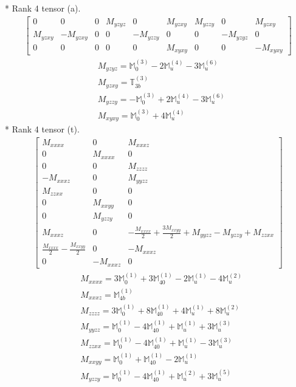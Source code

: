 \documentclass[fleqn,8pt,landscape]{jsarticle}
\begin{document}
* Rank 4 tensor (a).
\begin{align*}
\begin{bmatrix} 0 & 0 & 0 & M_{yzyz} & 0 & M_{yzxy} & M_{yzzy} & 0 & M_{yzxy} \\ M_{yzxy} & - M_{yzxy} & 0 & 0 & - M_{yzzy} & 0 & 0 & - M_{yzyz} & 0 \\ 0 & 0 & 0 & 0 & 0 & M_{xyxy} & 0 & 0 & - M_{xyxy} \end{bmatrix}
\end{align*}
\begin{align*}
& M_{yzyz} = \mathbb{M}_{0}^{(3)} - 2 \mathbb{M}_{u}^{(4)} - 3 \mathbb{M}_{u}^{(6)} \\
& M_{yzxy} = \mathbb{T}_{3b}^{(3)} \\
& M_{yzzy} = - \mathbb{M}_{0}^{(3)} + 2 \mathbb{M}_{u}^{(4)} - 3 \mathbb{M}_{u}^{(6)} \\
& M_{xyxy} = \mathbb{M}_{0}^{(3)} + 4 \mathbb{M}_{u}^{(4)}
\end{align*}
* Rank 4 tensor (t).
\begin{align*}
\begin{bmatrix} M_{xxxx} & 0 & M_{xxxz} \\ 0 & M_{xxxx} & 0 \\ 0 & 0 & M_{zzzz} \\ - M_{xxxz} & 0 & M_{yyzz} \\ M_{zzxx} & 0 & 0 \\ 0 & M_{xxyy} & 0 \\ 0 & M_{yzzy} & 0 \\ M_{xxxz} & 0 & - \frac{M_{xxxx}}{2} + \frac{3 M_{xxyy}}{2} + M_{yyzz} - M_{yzzy} + M_{zzxx} \\ \frac{M_{xxxx}}{2} - \frac{M_{xxyy}}{2} & 0 & - M_{xxxz} \\ 0 & - M_{xxxz} & 0 \end{bmatrix}
\end{align*}
\begin{align*}
& M_{xxxx} = 3 \mathbb{M}_{0}^{(1)} + 3 \mathbb{M}_{40}^{(1)} - 2 \mathbb{M}_{u}^{(1)} - 4 \mathbb{M}_{u}^{(2)} \\
& M_{xxxz} = \mathbb{M}_{4b}^{(1)} \\
& M_{zzzz} = 3 \mathbb{M}_{0}^{(1)} + 8 \mathbb{M}_{40}^{(1)} + 4 \mathbb{M}_{u}^{(1)} + 8 \mathbb{M}_{u}^{(2)} \\
& M_{yyzz} = \mathbb{M}_{0}^{(1)} - 4 \mathbb{M}_{40}^{(1)} + \mathbb{M}_{u}^{(1)} + 3 \mathbb{M}_{u}^{(3)} \\
& M_{zzxx} = \mathbb{M}_{0}^{(1)} - 4 \mathbb{M}_{40}^{(1)} + \mathbb{M}_{u}^{(1)} - 3 \mathbb{M}_{u}^{(3)} \\
& M_{xxyy} = \mathbb{M}_{0}^{(1)} + \mathbb{M}_{40}^{(1)} - 2 \mathbb{M}_{u}^{(1)} \\
& M_{yzzy} = \mathbb{M}_{0}^{(1)} - 4 \mathbb{M}_{40}^{(1)} + \mathbb{M}_{u}^{(2)} + 3 \mathbb{M}_{u}^{(5)}
\end{align*}
\end{document}
